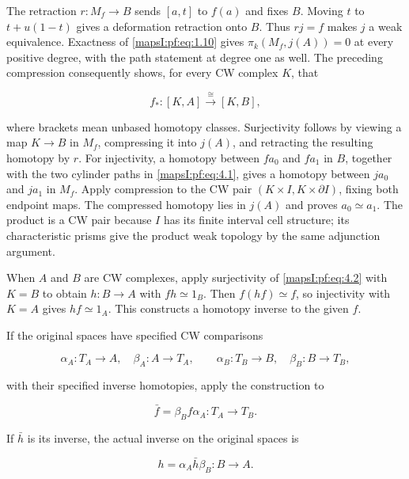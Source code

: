 \documentclass[11pt]{article}
\begin{document}
The retraction \(r:M_f\to B\) sends \([a,t]\) to \(f(a)\) and fixes \(B\). Moving \(t\) to \(t+u(1-t)\) gives a deformation retraction onto \(B\). Thus \(rj=f\) makes \(j\) a weak equivalence. Exactness of \eqref{mapsI:pf:eq:1.10} gives \(\pi_k(M_f,j(A))=0\) at every positive degree, with the path statement at degree one as well. The preceding compression consequently shows, for every CW complex \(K\), that

\begin{equation}
f_*:[K,A]\xrightarrow{\ \cong\ }[K,B],
\label{mapsI:pf:eq:4.2}
\end{equation}

where brackets mean unbased homotopy classes. Surjectivity follows by viewing a map \(K\to B\) in \(M_f\), compressing it into \(j(A)\), and retracting the resulting homotopy by \(r\). For injectivity, a homotopy between \(f a_0\) and \(f a_1\) in \(B\), together with the two cylinder paths in \eqref{mapsI:pf:eq:4.1}, gives a homotopy between \(j a_0\) and \(j a_1\) in \(M_f\). Apply compression to the CW pair \((K\times I,K\times\partial I)\), fixing both endpoint maps. The compressed homotopy lies in \(j(A)\) and proves \(a_0\simeq a_1\). The product is a CW pair because \(I\) has its finite interval cell structure; its characteristic prisms give the product weak topology by the same adjunction argument.

When \(A\) and \(B\) are CW complexes, apply surjectivity of \eqref{mapsI:pf:eq:4.2} with \(K=B\) to obtain \(h:B\to A\) with \(fh\simeq1_B\). Then \(f(hf)\simeq f\), so injectivity with \(K=A\) gives \(hf\simeq1_A\). This constructs a homotopy inverse to the given \(f\).

If the original spaces have specified CW comparisons

\begin{equation}
\alpha_A:T_A\to A,\quad\beta_A:A\to T_A,\qquad
\alpha_B:T_B\to B,\quad\beta_B:B\to T_B,
\label{mapsI:pf:eq:4.3}
\end{equation}

with their specified inverse homotopies, apply the construction to

\begin{equation}
\bar f=\beta_B f\alpha_A:T_A\to T_B.
\label{mapsI:pf:eq:4.4}
\end{equation}

If \(\bar h\) is its inverse, the actual inverse on the original spaces is

\begin{equation}
h=\alpha_A\bar h\beta_B:B\to A.
\label{mapsI:pf:eq:4.5}
\end{equation}
\end{document}
